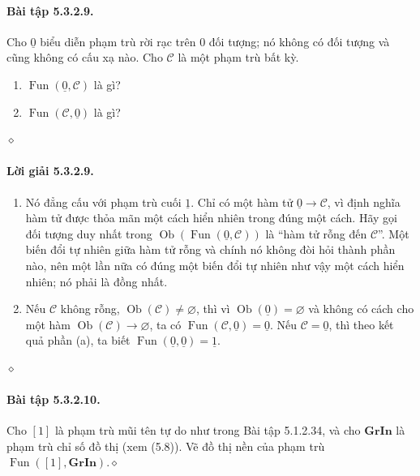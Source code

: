 \paragraph{Bài tập 5.3.2.9.} Cho $\underline{0}$ biểu diễn phạm trù rời rạc trên 0 đối tượng; nó không có đối tượng và cũng không có cấu xạ nào. Cho $\mathcal C$ là một phạm trù bất kỳ.
\begin{enumerate}[label=\alph*.]\item $\operatorname{Fun}(\underline{0},\mathcal C)$ là gì?\item $\operatorname{Fun}(\mathcal C,\underline{0})$ là gì?\end{enumerate}\hfill$\diamond$
\paragraph{Lời giải 5.3.2.9.}
\begin{enumerate}[label=\alph*.]
\item Nó đẳng cấu với phạm trù cuối $\underline{1}$. Chỉ có một hàm tử $\underline{0}\to\mathcal C$, vì định nghĩa hàm tử được thỏa mãn một cách hiển nhiên trong đúng một cách. Hãy gọi đối tượng duy nhất trong $\operatorname{Ob}(\operatorname{Fun}(\underline{0},\mathcal C))$ là ``hàm tử rỗng đến $\mathcal C$''. Một biến đổi tự nhiên giữa hàm tử rỗng và chính nó không đòi hỏi thành phần nào, nên một lần nữa có đúng một biến đổi tự nhiên như vậy một cách hiển nhiên; nó phải là đồng nhất.
\item Nếu $\mathcal C$ không rỗng, $\operatorname{Ob}(\mathcal C)\ne\varnothing$, thì vì $\operatorname{Ob}(\underline{0})=\varnothing$ và không có cách cho một hàm $\operatorname{Ob}(\mathcal C)\to\varnothing$, ta có $\operatorname{Fun}(\mathcal C,\underline{0})=\underline{0}$. Nếu $\mathcal C=\underline{0}$, thì theo kết quả phần (a), ta biết $\operatorname{Fun}(\underline{0},\underline{0})=\underline{1}$.
\end{enumerate}\hfill$\diamond$
\paragraph{Bài tập 5.3.2.10.} Cho $[1]$ là phạm trù mũi tên tự do như trong Bài tập 5.1.2.34, và cho $\mathbf{GrIn}$ là phạm trù chỉ số đồ thị (xem (5.8)). Vẽ đồ thị nền của phạm trù $\operatorname{Fun}([1],\mathbf{GrIn})$.\hfill$\diamond$
